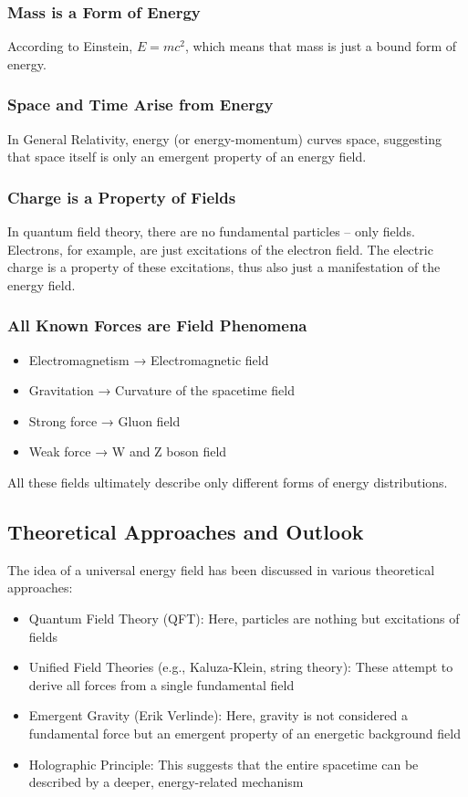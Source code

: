 \documentclass{article}
\begin{document}
\subsubsection{Mass is a Form of Energy}
According to Einstein, $E = mc^2$, which means that mass is just a bound form of energy.

\subsubsection{Space and Time Arise from Energy}
In General Relativity, energy (or energy-momentum) curves space, suggesting that space itself is only an emergent property of an energy field.

\subsubsection{Charge is a Property of Fields}
In quantum field theory, there are no fundamental particles – only fields. Electrons, for example, are just excitations of the electron field. The electric charge is a property of these excitations, thus also just a manifestation of the energy field.

\subsubsection{All Known Forces are Field Phenomena}
\begin{itemize}
	\item Electromagnetism → Electromagnetic field
	\item Gravitation → Curvature of the spacetime field
	\item Strong force → Gluon field
	\item Weak force → W and Z boson field
\end{itemize}

All these fields ultimately describe only different forms of energy distributions.

\subsection{Theoretical Approaches and Outlook}

The idea of a universal energy field has been discussed in various theoretical approaches:

\begin{itemize}
	\item Quantum Field Theory (QFT): Here, particles are nothing but excitations of fields
	\item Unified Field Theories (e.g., Kaluza-Klein, string theory): These attempt to derive all forces from a single fundamental field
	\item Emergent Gravity (Erik Verlinde): Here, gravity is not considered a fundamental force but an emergent property of an energetic background field
	\item Holographic Principle: This suggests that the entire spacetime can be described by a deeper, energy-related mechanism
\end{itemize}
\end{document}

